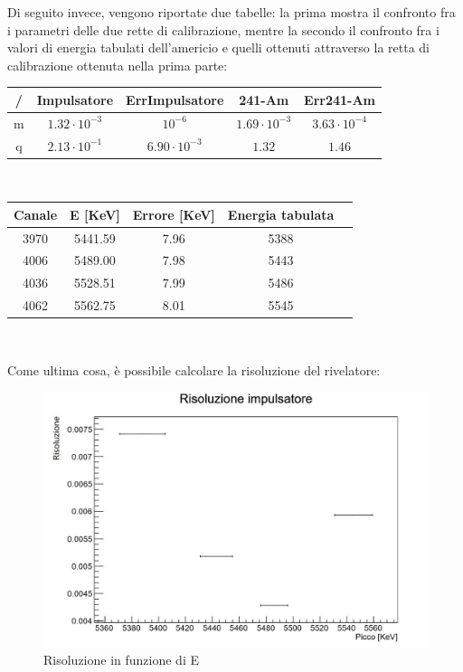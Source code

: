 \documentclass[a4paper,10pt]{article}
\begin{document}
Di seguito invece, vengono riportate due tabelle: la prima mostra il confronto fra i parametri delle due rette di calibrazione, mentre la secondo il confronto fra i valori di energia tabulati dell'americio e quelli ottenuti attraverso la retta di calibrazione ottenuta nella prima parte:\\

\begin{center}
\begin{tabular}{ccccc}
\toprule
/ & Impulsatore & ErrImpulsatore & 241-Am & Err241-Am\\
\midrule
m & $1.32\cdot10^{-3}$ & $10^{-6}$ & $1.69\cdot10^{-3}$ & $3.63\cdot10^{-4}$\\
q & $2.13\cdot10^{-1}$ & $6.90\cdot10^{-3}$ & $1.32$ & $1.46$\\
\bottomrule
\end{tabular}\\
\end{center}
\begin{center}
\begin{tabular}{ccccc}
\toprule
Canale & E [KeV] & Errore [KeV] & Energia tabulata\\
\midrule
3970 & 5441.59 & 7.96 & 5388\\
4006 & 5489.00 & 7.98 & 5443\\
4036 & 5528.51 & 7.99 & 5486\\
4062 & 5562.75 & 8.01 & 5545\\
\bottomrule
\end{tabular}\\
\end{center}

Come ultima cosa, è possibile calcolare la risoluzione del rivelatore:\\

\begin{figure}[H]
\centering
\includegraphics[scale=0.5]{risoluzione.jpg}
\caption{Risoluzione in funzione di E}
\end{figure}
\end{document}
